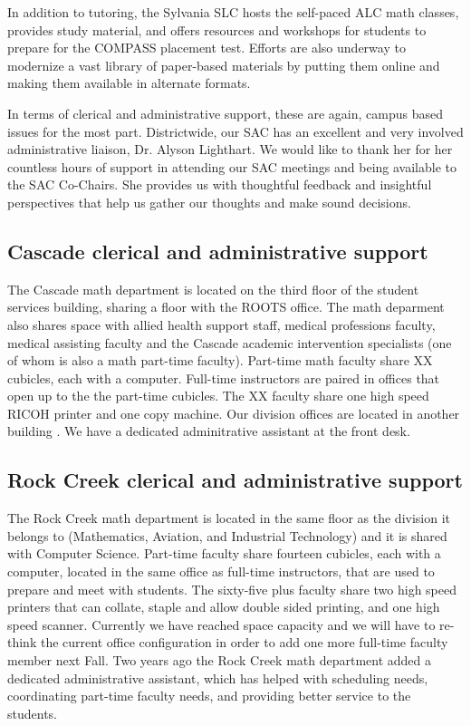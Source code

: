 In addition to tutoring, the Sylvania SLC hosts the self-paced ALC math
classes, provides study material, and offers resources and workshops for
students to prepare for the COMPASS placement test. Efforts are also underway
to modernize a vast library of paper-based materials by putting them online and
making them available in alternate formats.

In terms of clerical and administrative support, these are again, campus based issues for the most part. Districtwide, our SAC has an excellent and very involved administrative liaison, Dr. Alyson Lighthart. We would like to thank her for her countless hours of support in attending our SAC meetings and being available to the SAC Co-Chairs. She provides us with thoughtful feedback and insightful perspectives that help us gather our thoughts and make sound decisions. 


\subsection{Cascade clerical and administrative support}
The Cascade math department is located on the third floor of the student services building, sharing a floor with the ROOTS office. The math deparment also shares space with allied health support staff, medical professions faculty, medical assisting faculty and the Cascade academic intervention specialists (one of whom is also a math part-time faculty).  Part-time math faculty share XX cubicles, each with a computer. Full-time instructors are paired in offices that open up to the the part-time cubicles. The XX faculty share one high speed RICOH printer and one copy machine. Our division offices are located in another building . We have a dedicated adminitrative assistant at the front desk. 

\subsection{Rock Creek clerical and administrative support}
The Rock Creek math department is located in the same floor as the division it belongs to (Mathematics, Aviation, and Industrial Technology) and it is shared with Computer Science.   Part-time faculty share fourteen cubicles, each with a computer, located in the same office as full-time instructors, that are used to prepare and meet with students. The sixty-five plus faculty share two high speed printers that can collate, staple and allow double sided printing, and one high speed scanner. Currently we have reached space capacity and we will have to re-think the current office configuration in order to add one more full-time faculty member next Fall.  Two years ago the Rock Creek math department added a dedicated administrative assistant, which has helped with scheduling needs, coordinating part-time faculty needs, and providing better service to the students.  

